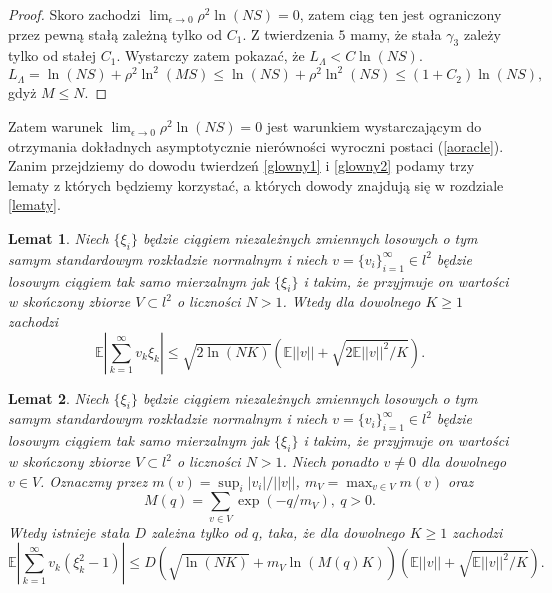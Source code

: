 \documentclass{article}
\newtheorem{lm}{Lemat}
\begin{document}
\begin{proof}
Skoro zachodzi $\lim_{\epsilon\to 0}\rho^2\ln(NS)=0$, zatem ciąg ten jest ograniczony przez pewną stałą zależną tylko od $C_1$. Z twierdzenia $5$ mamy, że stała $\gamma_3$ zależy tylko od stałej $C_1$. Wystarczy zatem pokazać, że $L_{\Lambda}<C\ln(NS)$. 
\begin{displaymath}
L_{\Lambda}=\ln(NS)+\rho^2\ln^2(MS)\leq \ln(NS)+\rho^2\ln^2(NS)\leq (1+C_2)\ln(NS),
\end{displaymath}
gdyż $M\leq N$.
\end{proof}
Zatem warunek $\lim_{\epsilon\to 0}\rho^2\ln(NS)=0$ jest warunkiem wystarczającym do otrzymania dokładnych asymptotycznie nierówności wyroczni postaci (\ref{aoracle}).\\
Zanim przejdziemy do dowodu twierdzeń \ref{glowny1} i \ref{glowny2} podamy trzy lematy z których będziemy korzystać, a których dowody znajdują się w rozdziale \ref{lematy}.
\begin{lm}\label{lem1}
Niech $\{\xi_i\}$ będzie ciągiem niezależnych zmiennych losowych o tym samym standardowym rozkładzie normalnym i niech $v=\{v_i\}_{i=1}^{\infty}\in l^2$ będzie losowym ciągiem tak samo mierzalnym jak $\{\xi_i\}$ i takim, że przyjmuje on wartości w skończony zbiorze $V\subset l^2$ o liczności $N>1$. Wtedy dla dowolnego $K\geq 1$ zachodzi
\begin{displaymath}
\mathbb{E}\left|\sum_{k=1}^{\infty}v_k\xi_k\right|\leq \sqrt{2\ln (NK)}\left(\mathbb{E}||v||+\sqrt{2\mathbb{E}||v||^2/K}\right).
\end{displaymath}
\end{lm}

\begin{lm}\label{lem2}
Niech $\{\xi_i\}$ będzie ciągiem niezależnych zmiennych losowych o tym samym standardowym rozkładzie normalnym i niech $v=\{v_i\}_{i=1}^{\infty}\in l^2$ będzie losowym ciągiem tak samo mierzalnym jak $\{\xi_i\}$ i takim, że przyjmuje on wartości w skończony zbiorze $V\subset l^2$ o liczności $N>1$. Niech ponadto $v\neq 0$ dla dowolnego $v\in V$. Oznaczmy przez $m(v)=\sup_i |v_i|/||v||$, $m_V=\max_{v\in V}m(v)$ oraz 
\begin{displaymath}
M(q)=\sum_{v\in V}\exp (-q/m_V),\ q>0.
\end{displaymath}
Wtedy istnieje stała $D$ zależna tylko od $q$, taka, że dla dowolnego $K\geq 1$ zachodzi
\begin{displaymath}
\mathbb{E}\left|\sum_{k=1}^{\infty}v_k(\xi_k^2-1)\right|\leq D\left(\sqrt{\ln (NK)}+m_V\ln (M(q)K)\right)\left(\mathbb{E}||v||+\sqrt{\mathbb{E}||v||^2/K}\right).
\end{displaymath}
\end{lm}
\end{document}

